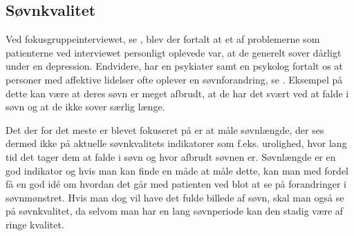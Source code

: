 \subsection{Søvnkvalitet}
Ved fokusgruppeinterviewet, se \citep[Kapitel 1, Sektion 5]{misc:faellesrapp}, blev der fortalt at et af problemerne som patienterne ved interviewet personligt oplevede var, at de generelt sover dårligt under en depression.
Endvidere, har en psykiater samt en psykolog fortalt os at personer med affektive lidelser ofte oplever en søvnforandring, se \citep[Kapitel 1, Sektion 3 og 4]{misc:faellesrapp}.
Eksempel på dette kan være at deres søvn er meget afbrudt, at de har det svært ved at falde i søvn og at de ikke sover særlig længe.

Det der for det meste er blevet fokuseret på er at måle søvnlængde, der ses dermed ikke på aktuelle søvnkvalitets indikatorer som f.eks. urolighed, hvor lang tid det tager dem at falde i søvn og hvor afbrudt søvnen er.
Søvnlængde er en god indikator og hvis man kan finde en måde at måle dette, kan man med fordel få en god idé om hvordan det går med patienten ved blot at se på forandringer i søvnmønstret. 
Hvis man dog vil have det fulde billede af søvn, skal man også se på søvnkvalitet, da selvom man har en lang søvnperiode kan den stadig være af ringe kvalitet.